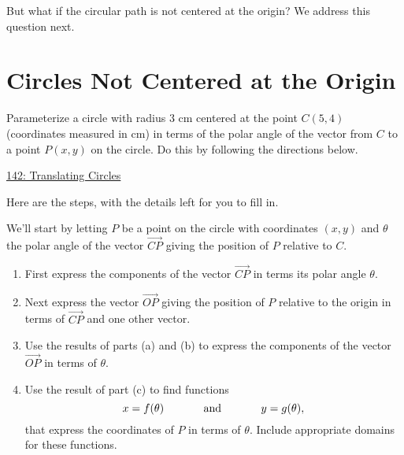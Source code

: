 \documentclass{ximera}
\begin{document}
\begin{question}  \label{Ex:sdfdsfdfL}

But what if the circular path is not centered at the origin? We address this question next.

\section{Circles Not Centered at the Origin}

Parameterize a circle with radius $3$ cm centered at the point $C(5,4)$ (coordinates measured in cm) in terms of the polar angle of the vector from $C$ to a point $P(x,y)$ on the circle. Do this by following the directions below.

\begin{onlineOnly}
    \begin{center}
\end{center}
\end{onlineOnly}

\href{https://www.desmos.com/calculator/pcndel98wg}{142: Translating Circles}


\begin{explanation} 

Here are the steps, with the details left for you to fill in.

We'll start by letting $P$ be a point on the circle with coordinates $(x,y)$ and $\theta$ the polar angle of the vector $\overrightarrow{CP}$ giving the position of $P$ relative to $C$.

\begin{enumerate}
\item First express the components of the vector $\overrightarrow{CP}$ in terms its polar angle $\theta$.

\item Next express the vector $\overrightarrow{OP}$ giving the position of $P$ relative to the origin in terms of $\overrightarrow{CP}$ and one other vector.

\item Use the results of parts (a) and (b) to express the components of the vector $\overrightarrow{OP}$ in terms of $\theta$.

\item Use the result of part (c) to find functions
\[
    x = f(\theta)  \hskip 0.5 in \text{and} \hskip 0.5in  y=g(\theta) ,
\]
that express the coordinates of $P$ in terms of $\theta$. Include appropriate domains for these functions. 


\end{enumerate}
\end{explanation}
\end{question}
\end{document}
